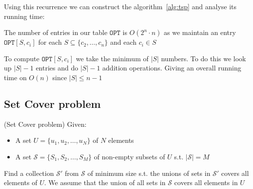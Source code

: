 \documentclass{article}
\begin{document}
Using this recurrence we can construct the algorithm~\ref{alg:tsp} and analyse its running time:
\begin{algorithm}[ht]
  \caption{Travelling Salesman Problem (TSP)}


\end{algorithm}

The number of entries in our table $\texttt{OPT} $ is $O(2^{n}\cdot n)$ as we maintain an entry $\texttt{OPT} [S,c_{i}]$ for each $S\subseteq \{ c_{2},\ldots,c_{n} \} $ and each $c_{i} \in S$

To compute $\texttt{OPT} [S,c_{i}]$ we take the minimum of $|S|$ numbers. To do this we look up $|S|-1$ entries and do $|S|-1$ addition operations. Giving an overall running time on $O(n)$ since $|S| \leq n-1$

\newpage
\subsection{Set Cover problem}

\begin{problem}(Set Cover problem)
  Given:

  \begin{itemize}
    \item A set $U = \{ u_{1},u_{2},\ldots,u_{N} \} $ of $N$ elements
    \item A set $\mathcal{S} = \{ S_{1},S_{2},\ldots,S_{M} \} $  of non-empty subsets of $U$ s.t. $|\mathcal{S}| = M$
  \end{itemize}

  Find a collection $\mathcal{S}'$ from $\mathcal{S}$ of minimum size s.t. the unions of sets in $\mathcal{S}'$ covers all elements of $U$. We assume that the union of all sets in $\mathcal{S}$ covers all elements in $U$
\end{problem}
\end{document}
